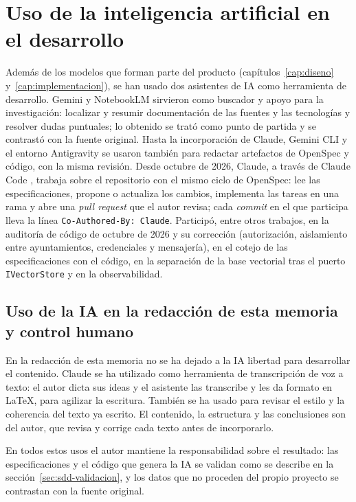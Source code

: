 \section{Uso de la inteligencia artificial en el desarrollo}
\label{sec:ia-desarrollo}

Además de los modelos que forman parte del producto (capítulos~\ref{cap:diseno} y~\ref{cap:implementacion}), se han usado dos asistentes de IA como herramienta de desarrollo. Gemini \cite{gemini} y NotebookLM sirvieron como buscador y apoyo para la investigación: localizar y resumir documentación de las fuentes y las tecnologías y resolver dudas puntuales; lo obtenido se trató como punto de partida y se contrastó con la fuente original. Hasta la incorporación de Claude, Gemini CLI y el entorno Antigravity se usaron también para redactar artefactos de OpenSpec y código, con la misma revisión.
Desde octubre de 2026, Claude, a través de Claude Code \cite{claudecode}, trabaja sobre el repositorio con el mismo ciclo de OpenSpec: lee las especificaciones, propone o actualiza los cambios, implementa las tareas en una rama y abre una \emph{pull request} que el autor revisa; cada \emph{commit} en el que participa lleva la línea \texttt{Co-Authored-By: Claude}. Participó, entre otros trabajos, en la auditoría de código de octubre de 2026 y su corrección (autorización, aislamiento entre ayuntamientos, credenciales y mensajería), en el cotejo de las especificaciones con el código, en la separación de la base vectorial tras el puerto \texttt{IVectorStore} y en la observabilidad.

\subsection{Uso de la IA en la redacción de esta memoria y control humano}

En la redacción de esta memoria no se ha dejado a la IA libertad para desarrollar el contenido. Claude se ha utilizado como herramienta de transcripción de voz a texto: el autor dicta sus ideas y el asistente las transcribe y les da formato en \LaTeX, para agilizar la escritura. También se ha usado para revisar el estilo y la coherencia del texto ya escrito. El contenido, la estructura y las conclusiones son del autor, que revisa y corrige cada texto antes de incorporarlo.

En todos estos usos el autor mantiene la responsabilidad sobre el resultado: las especificaciones y el código que genera la IA se validan como se describe en la sección~\ref{sec:sdd-validacion}, y los datos que no proceden del propio proyecto se contrastan con la fuente original.

